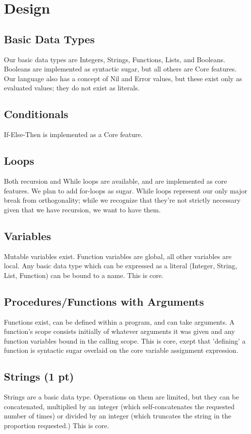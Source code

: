 \documentclass{article}
\begin{document}
\section*{Design}

\subsection*{Basic Data Types}
Our basic data types are Integers, Strings, Functions, Lists, and Booleans.  Booleans are implemented as syntactic sugar, but all others are Core features.  Our language also has a concept of Nil and Error values, but these exist only as evaluated values; they do not exist as literals.

\subsection*{Conditionals}
If-Else-Then is implemented as a Core feature.

\subsection*{Loops}
Both recursion and While loops are available, and are implemented as core features.  We plan to add for-loops as sugar.  While loops represent our only major break from orthogonality; while we recognize that they're not strictly necessary given that we have recursion, we want to have them.

\subsection*{Variables}
Mutable variables exist.  Function variables are global, all other variables are local.  Any basic data type which can be expressed as a literal (Integer, String, List, Function) can be bound to a name.  This is core.

\subsection*{Procedures/Functions with Arguments}
Functions exist, can be defined within a program, and can take arguments.  A function's scope consists initially of whatever arguments it was given and any function variables bound in the calling scope.  This is core, exept that 'defining' a function is syntactic sugar overlaid on the core variable assignment expression.

\subsection*{Strings (1 pt)}
Strings are a basic data type.  Operations on them are limited, but they can be concatenated, multiplied by an integer (which self-concatenates the requested number of times) or divided by an integer (which truncates the string in the proportion requested.)  This is core.
\end{document}
